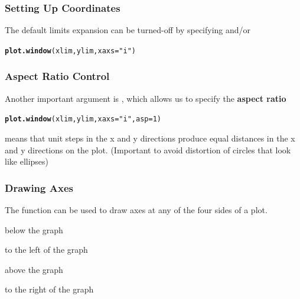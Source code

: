 \documentclass[12pt]{beamer}\usepackage[]{graphicx}\usepackage[]{color}
\makeatletter
\newcommand{\hlnum}[1]{\textcolor[rgb]{0.686,0.059,0.569}{#1}}%
\newcommand{\hlstr}[1]{\textcolor[rgb]{0.192,0.494,0.8}{#1}}%
\newcommand{\hlstd}[1]{\textcolor[rgb]{0.345,0.345,0.345}{#1}}%
\newcommand{\hlkwc}[1]{\textcolor[rgb]{0.333,0.667,0.333}{#1}}%
\newcommand{\hlkwd}[1]{\textcolor[rgb]{0.737,0.353,0.396}{\textbf{#1}}}%
\newenvironment{kframe}{%
 \def\at@end@of@kframe{}%
 \ifinner\ifhmode%
  \def\at@end@of@kframe{\end{minipage}}%
  \begin{minipage}{\columnwidth}%
 \fi\fi%
 \def\FrameCommand##1{\hskip\@totalleftmargin \hskip-\fboxsep
 \colorbox{shadecolor}{##1}\hskip-\fboxsep
     \hskip-\linewidth \hskip-\@totalleftmargin \hskip\columnwidth}%
 \MakeFramed {\advance\hsize-\width
   \@totalleftmargin\z@ \linewidth\hsize
   \@setminipage}}%
 {\par\unskip\endMakeFramed%
 \at@end@of@kframe}
\newenvironment{knitrout}{}{} %
\makeatother
\begin{document}

\begin{frame}[fragile]
\frametitle{Setting Up Coordinates}

The default limits expansion can be turned-off by specifying  and/or 
\begin{knitrout}\footnotesize
{}\color{fgcolor}\begin{kframe}
\begin{alltt}
\hlkwd{plot.window}\hlstd{(xlim, ylim,} \hlkwc{xaxs} \hlstd{=} \hlstr{"i"}\hlstd{)}
\end{alltt}
\end{kframe}
\end{knitrout}

\end{frame}


\begin{frame}[fragile]
\frametitle{Aspect Ratio Control}

Another important argument is , which allows us to specify the \textbf{aspect ratio}
\begin{knitrout}\footnotesize
{}\color{fgcolor}\begin{kframe}
\begin{alltt}
\hlkwd{plot.window}\hlstd{(xlim, ylim,} \hlkwc{xaxs} \hlstd{=} \hlstr{"i"}\hlstd{,} \hlkwc{asp} \hlstd{=} \hlnum{1}\hlstd{)}
\end{alltt}
\end{kframe}
\end{knitrout}

 means that unit steps in the x and y directions produce equal distances in the x and y directions on the plot.
(Important to avoid distortion of circles that
look like ellipses)

\end{frame}


\begin{frame}[fragile]
\frametitle{Drawing Axes}

The  function can be used to draw axes at any of the four sides of a plot.
\bi
  \item {} below the graph
  \item {} to the left of the graph
  \item {} above the graph
  \item {} to the right of the graph
\ei

\end{frame}
\end{document}
